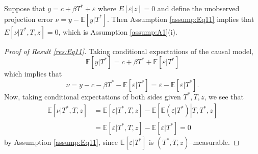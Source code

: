 \begin{res}
  \label{res:Eq11}
  Suppose that $y = c + \beta T^* + \varepsilon$ where $E[\varepsilon|z]=0$ and define the unobserved projection error $\nu = y - \mathbb{E}[y|T^*]$.
  Then Assumption \ref{assump:Eq11} implies that $E[\nu|T^*,T,z]=0$, which is Assumption \ref{assump:A1}(i).
\end{res}
\begin{proof}[Proof of Result \ref{res:Eq11}]
  Taking conditional expectations of the causal model,
  \[\mathbb{E}[y|T^*] = c + \beta T^* + \mathbb{E}[\varepsilon|T^*]\]
  which implies that 
  \[\nu = y - c - \beta T^* - \mathbb{E}[\varepsilon|T^*] = \varepsilon - \mathbb{E}[\varepsilon|T^*].\]
  Now, taking conditional expectations of both sides given $T^*,T,z$, we see that 
  \begin{align*}
  \mathbb{E}[\nu|T^*,T,z]&= \mathbb{E}[\varepsilon|T^*,T,z] - \mathbb{E}\left[ \mathbb{E}\left( \left.\varepsilon\right|T^* \right)\left. \right| T,T^*,z \right]\\
  &= \mathbb{E}[\varepsilon|T^*,T,z] - \mathbb{E}\left[ \left.\varepsilon\right|T^* \right] = 0
\end{align*}
by Assumption \ref{assump:Eq11}, since $\mathbb{E}[\varepsilon|T^*]$ is $(T^*,T,z)$--measurable.
\end{proof}

